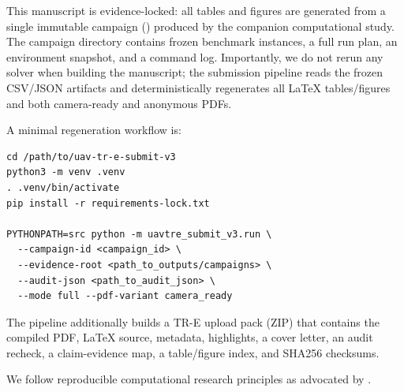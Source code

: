 This manuscript is evidence-locked: all tables and figures are generated from a single immutable campaign (\CampaignID) produced by the companion computational study. The campaign directory contains frozen benchmark instances, a full run plan, an environment snapshot, and a command log. Importantly, we do not rerun any solver when building the manuscript; the submission pipeline reads the frozen CSV/JSON artifacts and deterministically regenerates all LaTeX tables/figures and both camera-ready and anonymous PDFs.

A minimal regeneration workflow is:
\begin{verbatim}
cd /path/to/uav-tr-e-submit-v3
python3 -m venv .venv
. .venv/bin/activate
pip install -r requirements-lock.txt

PYTHONPATH=src python -m uavtre_submit_v3.run \
  --campaign-id <campaign_id> \
  --evidence-root <path_to_outputs/campaigns> \
  --audit-json <path_to_audit_json> \
  --mode full --pdf-variant camera_ready
\end{verbatim}

The pipeline additionally builds a TR-E upload pack (ZIP) that contains the compiled PDF, LaTeX source, metadata, highlights, a cover letter, an audit recheck, a claim-evidence map, a table/figure index, and SHA256 checksums.

We follow reproducible computational research principles as advocated by \citet{peng2011,stodden2016,sandve2013}.
